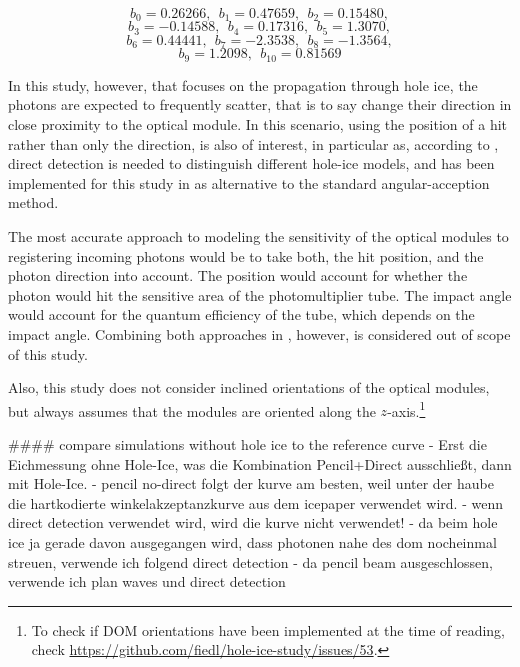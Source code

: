 $$ b_0 = 0.26266, \ \ b_1 = 0.47659, \ \ b_2 = 0.15480, $$
$$ b_3 = -0.14588, \ \ b_4 = 0.17316, \ \ b_5 = 1.3070, $$
$$ b_6 = 0.44441, \ \ b_7 = -2.3538, \ \ b_8 = -1.3564, $$
$$ b_9 = 1.2098, \ \ b_{10} = 0.81569 $$

In this study, however, that focuses on the propagation through hole ice, the photons are expected to frequently scatter, that is to say change their direction in close proximity to the optical module. In this scenario, using the position of a hit rather than only the direction, is also of interest, in particular as, according to  \cite{martinspicehddard}, direct detection is needed to distinguish different hole-ice models, and has been implemented for this study in  as alternative to the standard angular-acception method.


The most accurate approach to modeling the sensitivity of the optical modules to registering incoming photons would be to take both, the hit position, and the photon direction into account. The position would account for whether the photon would hit the sensitive area of the photomultiplier tube. The impact angle would account for the quantum efficiency of the tube, which depends on the impact angle. Combining both approaches in , however, is considered out of scope of this study.

Also, this study does not consider inclined orientations of the optical modules, but always assumes that the modules are oriented along the $z$-axis.\footnote{To check if DOM orientations have been implemented at the time of reading, check \url{https://github.com/fiedl/hole-ice-study/issues/53}.}



#### compare simulations without hole ice to the reference curve
- Erst die Eichmessung ohne Hole-Ice, was die Kombination Pencil+Direct ausschließt, dann mit Hole-Ice.
- pencil no-direct folgt der kurve am besten, weil unter der haube die hartkodierte winkelakzeptanzkurve aus dem icepaper verwendet wird.
- wenn direct detection verwendet wird, wird die kurve nicht verwendet!
- da beim hole ice ja gerade davon ausgegangen wird, dass photonen nahe des dom nocheinmal streuen, verwende ich folgend direct detection
- da pencil beam ausgeschlossen, verwende ich plan waves und direct detection


